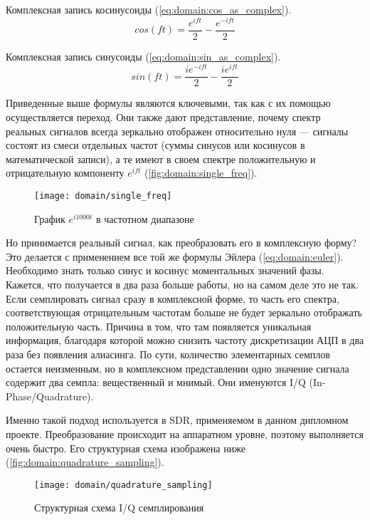 \bigskip
Комплексная запись косинусоиды (\autoref{eq:domain:cos_as_complex}).
\begin{equation}
  \label{eq:domain:cos_as_complex}
  cos(ft) = \frac{e^{ift}}{2} - \frac{e^{-ift}}{2}
\end{equation}

Комплексная запись синусоиды (\autoref{eq:domain:sin_as_complex}).
\begin{equation}
  \label{eq:domain:sin_as_complex}
  sin(ft) = \frac{ie^{-ift}}{2} - \frac{ie^{ift}}{2}
\end{equation}

Приведенные выше формулы являются ключевыми, так как с их помощью осуществляется переход. Они также дают представление, почему спектр реальных сигналов всегда зеркально отображен относительно нуля --- сигналы состоят из смеси отдельных частот (суммы синусов или косинусов в математической записи), а те имеют в своем спектре положительную и отрицательную компоненту $e^{ift}$ (\autoref{fig:domain:single_freq}).

\begin{figure}[h]
  \centering
  \texttt{[image: domain/single\_freq]}
  \caption{График $e^{i1000t}$ в частотном диапазоне}
  \label{fig:domain:single_freq}
\end{figure}

Но принимается реальный сигнал, как преобразовать его в комплексную форму? Это делается с применением все той же формулы Эйлера (\ref{eq:domain:euler}). Необходимо знать только синус и косинус моментальных значений фазы. Кажется, что получается в два раза больше работы, но на самом деле это не так. Если семплировать сигнал сразу в комплексной форме, то часть его спектра, соответствующая отрицательным частотам больше не будет зеркально отображать положительную часть. Причина в том, что там появляется уникальная информация, благодаря которой можно снизить частоту дискретизации АЦП в два раза без появления алиасинга. По сути, количество элементарных семплов остается неизменным, но в комплексном представлении одно значение сигнала содержит два семпла: вещественный и мнимый. Они именуются I/Q (In-Phase/Quadrature).

Именно такой подход используется в SDR, применяемом в данном дипломном проекте. Преобразование происходит на аппаратном уровне, поэтому выполняется очень быстро. Его структурная схема изображена ниже (\autoref{fig:domain:quadrature_sampling}).

\begin{figure}[h]
  \centering
  \texttt{[image: domain/quadrature\_sampling]}
  \caption{Структурная схема I/Q семплирования \cite{quadrature_signals}}
  \label{fig:domain:quadrature_sampling}
\end{figure}


